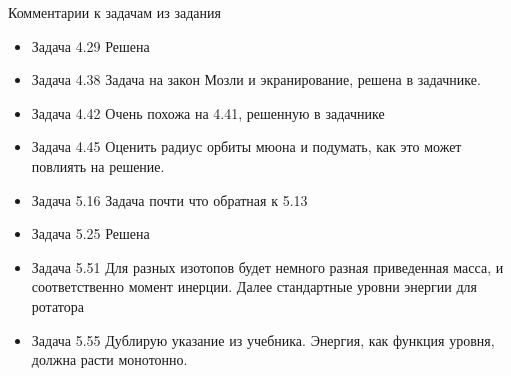 \documentclass[12]{beamer}
\begin{document}
\begin{frame}[t]{Комментарии к задачам из задания}\scriptsize
\begin{itemize}
\item Задача 4.29 Решена 
\item Задача 4.38 Задача на закон Мозли и экранирование, решена в задачнике.
\item Задача 4.42 Очень похожа на 4.41, решенную в задачнике
\item Задача 4.45 Оценить радиус орбиты мюона и подумать, как это может повлиять на решение. 
\item Задача 5.16 Задача почти что обратная к 5.13
\item Задача 5.25 Решена
\item Задача 5.51 Для разных изотопов будет немного разная приведенная масса, и соответственно момент инерции. Далее стандартные уровни энергии для ротатора
\item Задача 5.55 Дублирую указание из учебника. Энергия, как функция уровня, должна расти монотонно. 
\end{itemize}
\end{frame}
\end{document}
